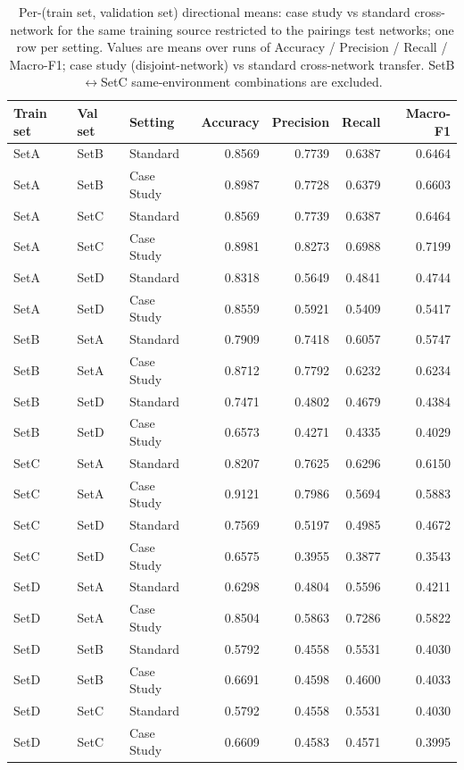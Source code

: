 \begin{table}
\caption{Per-(train set, validation set) directional means: case study vs standard cross-network for the same training source restricted to the pairings test networks; one row per setting. Values are means over runs of Accuracy / Precision / Recall / Macro-F1; case study (disjoint-network) vs standard cross-network transfer. SetB$\leftrightarrow$SetC same-environment combinations are excluded.}
\label{tab:q5_appendix_per_pairing_test}
\begin{tabular}{lllrrrr}
\toprule
Train set & Val set & Setting & Accuracy & Precision & Recall & Macro-F1 \\
\midrule
SetA & SetB & Standard & 0.8569 & 0.7739 & 0.6387 & 0.6464 \\
SetA & SetB & Case Study & 0.8987 & 0.7728 & 0.6379 & 0.6603 \\
SetA & SetC & Standard & 0.8569 & 0.7739 & 0.6387 & 0.6464 \\
SetA & SetC & Case Study & 0.8981 & 0.8273 & 0.6988 & 0.7199 \\
SetA & SetD & Standard & 0.8318 & 0.5649 & 0.4841 & 0.4744 \\
SetA & SetD & Case Study & 0.8559 & 0.5921 & 0.5409 & 0.5417 \\
SetB & SetA & Standard & 0.7909 & 0.7418 & 0.6057 & 0.5747 \\
SetB & SetA & Case Study & 0.8712 & 0.7792 & 0.6232 & 0.6234 \\
SetB & SetD & Standard & 0.7471 & 0.4802 & 0.4679 & 0.4384 \\
SetB & SetD & Case Study & 0.6573 & 0.4271 & 0.4335 & 0.4029 \\
SetC & SetA & Standard & 0.8207 & 0.7625 & 0.6296 & 0.6150 \\
SetC & SetA & Case Study & 0.9121 & 0.7986 & 0.5694 & 0.5883 \\
SetC & SetD & Standard & 0.7569 & 0.5197 & 0.4985 & 0.4672 \\
SetC & SetD & Case Study & 0.6575 & 0.3955 & 0.3877 & 0.3543 \\
SetD & SetA & Standard & 0.6298 & 0.4804 & 0.5596 & 0.4211 \\
SetD & SetA & Case Study & 0.8504 & 0.5863 & 0.7286 & 0.5822 \\
SetD & SetB & Standard & 0.5792 & 0.4558 & 0.5531 & 0.4030 \\
SetD & SetB & Case Study & 0.6691 & 0.4598 & 0.4600 & 0.4033 \\
SetD & SetC & Standard & 0.5792 & 0.4558 & 0.5531 & 0.4030 \\
SetD & SetC & Case Study & 0.6609 & 0.4583 & 0.4571 & 0.3995 \\
\bottomrule
\end{tabular}
\end{table}
